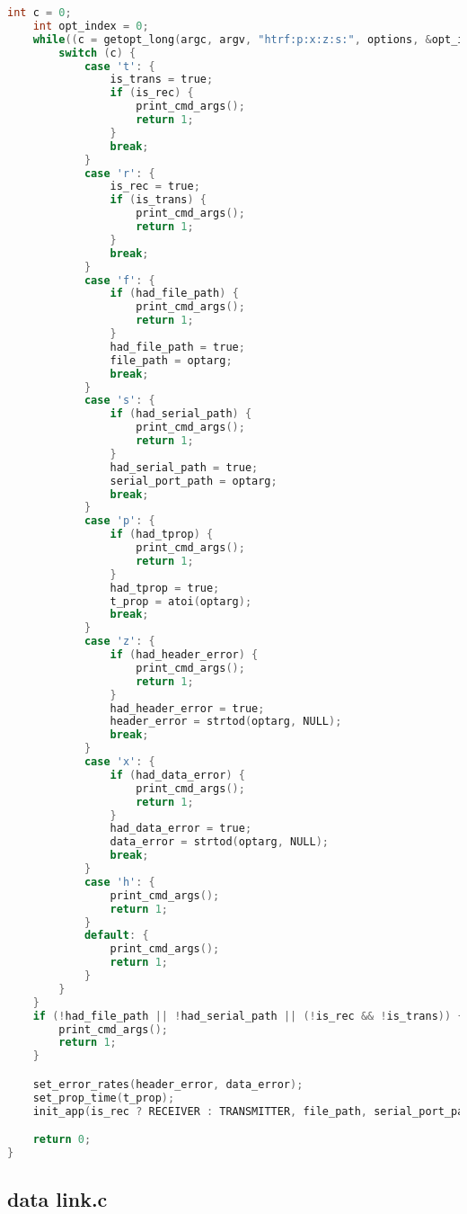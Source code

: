 \begin{lstlisting}[language=C, caption=main.c]
    int c = 0;
    int opt_index = 0;
    while((c = getopt_long(argc, argv, "htrf:p:x:z:s:", options, &opt_index)) != -1) {
        switch (c) {
            case 't': {
                is_trans = true;
                if (is_rec) {
                    print_cmd_args();
                    return 1;
                }
                break;
            }
            case 'r': {
                is_rec = true;
                if (is_trans) {
                    print_cmd_args();
                    return 1;
                }
                break;
            }
            case 'f': {
                if (had_file_path) {
                    print_cmd_args();
                    return 1;
                }
                had_file_path = true;
                file_path = optarg;
                break;
            }
            case 's': {
                if (had_serial_path) {
                    print_cmd_args();
                    return 1;
                }
                had_serial_path = true;
                serial_port_path = optarg;
                break;
            }
            case 'p': {
                if (had_tprop) {
                    print_cmd_args();
                    return 1;
                }
                had_tprop = true;
                t_prop = atoi(optarg);
                break;
            }
            case 'z': {
                if (had_header_error) {
                    print_cmd_args();
                    return 1;
                }
                had_header_error = true;
                header_error = strtod(optarg, NULL);
                break;
            }
            case 'x': {
                if (had_data_error) {
                    print_cmd_args();
                    return 1;
                }
                had_data_error = true;
                data_error = strtod(optarg, NULL);
                break;
            }
            case 'h': {
                print_cmd_args();
                return 1;
            }
            default: {
                print_cmd_args();
                return 1;
            }
        }
    }
    if (!had_file_path || !had_serial_path || (!is_rec && !is_trans)) {
        print_cmd_args();
        return 1;
    }

    set_error_rates(header_error, data_error);
    set_prop_time(t_prop);
    init_app(is_rec ? RECEIVER : TRANSMITTER, file_path, serial_port_path);

    return 0;
}
\end{lstlisting}

\subsection{data \textunderscore link.c}

